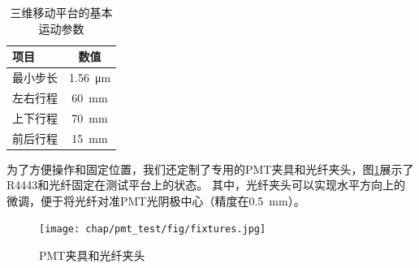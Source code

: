 \begin{table}[htb]
	\centering	
	\begin{tabulary}{0.6\linewidth}{LC}
		\toprule[1.5pt]
		\textbf{项目} & \textbf{数值}	\\ 
		\midrule[1pt]
		最小步长		& \SI{1.56}{\micro\meter}	\\
		左右行程		& \SI{60}{\milli\meter}	\\
		上下行程		& \SI{70}{\milli\meter}	\\
		前后行程		& \SI{15}{\milli\meter}	\\
		\bottomrule[1.5pt]
	\end{tabulary}
	\caption{三维移动平台的基本运动参数}
	\label{tab:pmt_test:motorized_stage}	
\end{table}
为了方便操作和固定位置，我们还定制了专用的PMT夹具和光纤夹头，图\ref{fig:pmt_test:fixtures}展示了R4443和光纤固定在测试平台上的状态。
其中，光纤夹头可以实现水平方向上的微调，便于将光纤对准PMT光阴极中心（精度在\SI{0.5}{mm}）。
\begin{figure}[htbp]
	\centering
	\texttt{[image: chap/pmt\_test/fig/fixtures.jpg]}
	\caption{PMT夹具和光纤夹头}
	\label{fig:pmt_test:fixtures}
\end{figure}

